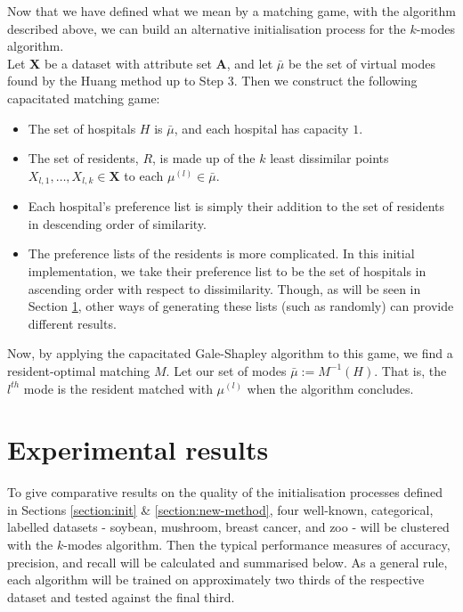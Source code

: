\documentclass{article}
\theoremstyle{definition}
\begin{document}
Now that we have defined what we mean by a matching game, with the algorithm 
described above, we can build an alternative initialisation process for the 
$k$-modes algorithm. \\

Let \textbf{X} be a dataset with attribute set \textbf{A}, and let $\bar{\mu}$ be the set of virtual modes found by the Huang method up to Step 3. Then we construct the following capacitated matching game:

\begin{itemize}
	\item The set of hospitals $H$ is $\bar{\mu}$, and each hospital has capacity $1$.

	\item The set of residents, $R$, is made up of the $k$ least dissimilar points $X_{l,1}, \ldots, X_{l,k} \in \textbf{X}$ to each $\mu^{(l)} \in \bar{\mu}$.

	\item Each hospital's preference list is simply their addition to the set of residents in descending order of similarity.
	
	\item The preference lists of the residents is more complicated. In this initial implementation, we take their preference list to be the set of hospitals in ascending order with respect to dissimilarity. Though, as will be seen in Section \ref{section:results}, other ways of generating these lists (such as randomly) can provide different results.
\end{itemize}

Now, by applying the capacitated Gale-Shapley algorithm to this game, we find a resident-optimal matching $M$. Let our set of modes $\bar{\mu} := M^{-1}(H)$. That is, the $l^{th}$ mode is the resident matched with $\mu^{(l)}$ when the algorithm concludes.



\section{Experimental results}\label{section:results}

To give comparative results on the quality of the initialisation processes defined in Sections \ref{section:init} \& \ref{section:new-method}, four well-known, categorical, labelled datasets - soybean, mushroom, breast cancer, and zoo - will be clustered with the $k$-modes algorithm. Then the typical performance measures of accuracy, precision, and recall will be calculated and summarised below. As a general rule, each algorithm will be trained on approximately two thirds of the respective dataset and tested against the final third.
\end{document}
